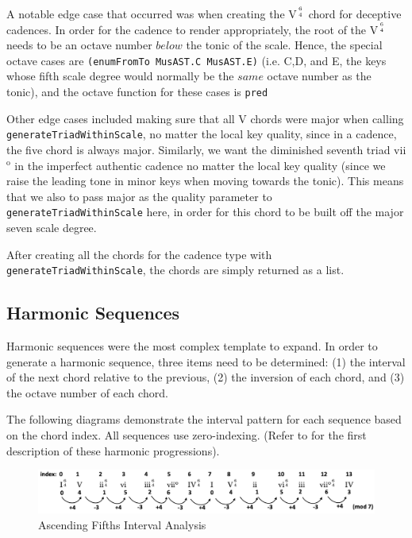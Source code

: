 \documentclass{report}
\begin{document}
A notable edge case that occurred was when creating the V$^{6 \atop 4}$ chord for deceptive cadences. In order for the cadence to render appropriately, the root of the V$^{6 \atop 4}$ needs to be an octave number $below$ the tonic of the scale. Hence, the special octave cases are \verb!(enumFromTo MusAST.C MusAST.E)! (i.e. C,D, and E, the keys whose  fifth scale degree would normally be the $same$ octave number as the tonic), and the octave function for these cases is  \verb.pred.

Other edge cases included making sure that all V chords were major when calling \\\verb.generateTriadWithinScale., no matter the local key quality, since in a cadence, the five chord is always major. Similarly, we want the diminished seventh triad vii$^\text{o}$ in the imperfect authentic cadence no matter the local key quality (since we raise the leading tone in minor keys when moving towards the tonic). This means that  we also to pass major as the quality parameter to \verb.generateTriadWithinScale. here, in order for this chord to be built off the major seven scale degree.

After creating all the chords for the cadence  type with  \verb.generateTriadWithinScale., the chords are simply returned as a list.

\subsection{Harmonic Sequences}
Harmonic sequences were the most complex template to expand. In order to generate a harmonic sequence, three items need to be determined: (1) the interval of the next chord relative to the previous, (2) the inversion of each chord, and (3) the octave number of each chord.

The following diagrams demonstrate the interval pattern for each sequence based on the chord index. All sequences use zero-indexing.  (Refer to  for the first description of these harmonic progressions).

\begin{figure}[h!]
\centering
\includegraphics[width=\textwidth]{images/asc_fifths_intervals}
  \caption{Ascending Fifths Interval Analysis}
\end{figure}
\end{document}

